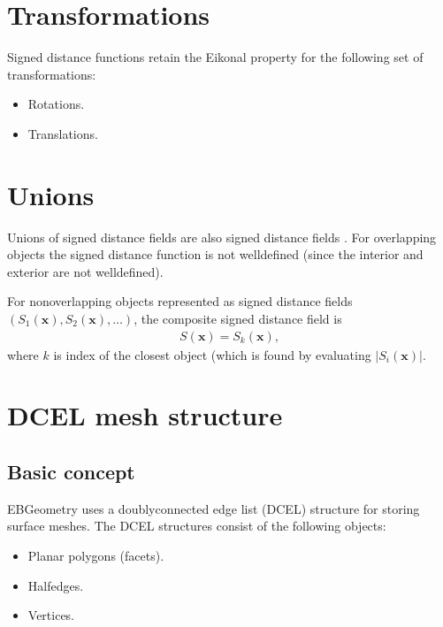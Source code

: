 \documentclass[letterpaper,10pt,english]{sphinxmanual}
\begin{document}
\section{Transformations}
\label{\detokenize{Concepts:transformations}}
\sphinxAtStartPar
Signed distance functions retain the Eikonal property for the following set of transformations:
\begin{itemize}
\item {} 
\sphinxAtStartPar
Rotations.

\item {} 
\sphinxAtStartPar
Translations.

\end{itemize}


\section{Unions}
\label{\detokenize{Concepts:unions}}
\sphinxAtStartPar
Unions of signed distance fields are also signed distance fields .
For overlapping objects the signed distance function is not well\sphinxhyphen{}defined (since the interior and exterior are not well\sphinxhyphen{}defined).

\sphinxAtStartPar
For non\sphinxhyphen{}overlapping objects represented as signed distance fields \(\left(S_1\left(\mathbf{x}\right), S_2\left(\mathbf{x}\right), \ldots\right)\), the composite signed distance field is
\begin{equation*}
\begin{split}S\left(\mathbf{x}\right) = S_k\left(\mathbf{x}\right),\end{split}
\end{equation*}
\sphinxAtStartPar
where \(k\) is index of the closest object (which is found by evaluating \(\left|S_i\left(\mathbf{x}\right)\right|\).

\sphinxstepscope


\section{DCEL mesh structure}
\label{\detokenize{DCEL:dcel-mesh-structure}}\label{\detokenize{DCEL:chap-dcel}}\label{\detokenize{DCEL::doc}}

\subsection{Basic concept}
\label{\detokenize{DCEL:basic-concept}}
\sphinxAtStartPar
EBGeometry uses a doubly\sphinxhyphen{}connected edge list (DCEL) structure for storing surface meshes.
The DCEL structures consist of the following objects:
\begin{itemize}
\item {} 
\sphinxAtStartPar
Planar polygons (facets).

\item {} 
\sphinxAtStartPar
Half\sphinxhyphen{}edges.

\item {} 
\sphinxAtStartPar
Vertices.

\end{itemize}
\end{document}
